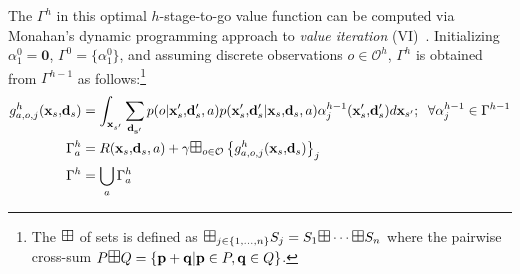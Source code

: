 \documentclass{article} %
\renewcommand{\vec}[1]{\mathbf{#1}} %
\newcommand{\xds}{\mathbf{x}_s,\!\mathbf{d}_s}
\newcommand{\xdsp}{\mathbf{x}_s',\!\mathbf{d}_s'}
\begin{document}
The $\Gamma^h$ in
this optimal $h$-stage-to-go value function can be computed via
Monahan's dynamic programming approach to \emph{value iteration}
(VI)~\cite{monahan82}.  Initializing $\alpha^0_1 = \vec{0}$, 
$\Gamma^0 = \{ \alpha^0_1 \}$, and assuming discrete 
observations $o \in \mathcal{O}^h$,
$\Gamma^h$ is obtained from
$\Gamma^{h-1}$ as follows:\footnote{The
  $\textrm{\large $\boxplus$}$ of sets is defined as $\textrm{\large
    $\boxplus$}_{j \in \{ 1,\ldots, n \} } S_j = S_1 \textrm{\large
    $\boxplus$} \cdots \textrm{\large $\boxplus$} S_n$ where the
  pairwise cross-sum $P \textrm{\large $\boxplus$} Q = \{ \vec{p} +
  \vec{q} | \vec{p} \in P, \vec{q} \in Q \}$.}  
{\footnotesize
\vspace{-1mm}
\begin{align} 
g^h_{a,o,j}(\xds) &=  \int_{\vec{x}_{s'}} \sum_{\vec{d_{s'}}} p(o|\xdsp,a)p(\xdsp|\xds,a) \alpha^{h-1}_j(\xdsp) d\vec{x}_{s'}; \hspace{2mm}  \forall \alpha^{h-1}_{j} \in \Gamma^{h-1} \label{eq:backup} \\
\Gamma^{h}_a   &= R(\xds,a) + \gamma \textrm{\large $\boxplus$}_{o \in \mathcal{O}} \left\{ g^h_{a,o,j}(\xds) \right\}_j  \label{eq:cross_prod}\\ 
\Gamma^h  &= \bigcup_a \Gamma^h_a 
\end{align}
\vspace{-4mm}
}
\end{document}
